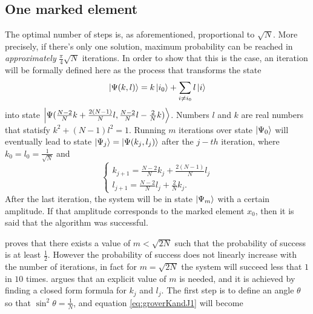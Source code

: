\documentclass[../../dissertation.tex]{subfiles}
\begin{document}
\subsection{One marked element}
The optimal number of steps is, as aforementioned, proportional to $\sqrt{N}$. More precisely, if there's only one solution, maximum probability can be reached in \textit{approximately} $\frac{\pi}{4}\sqrt{N}$ iterations. In order to show that this is the case, an iteration will be formally defined here as the process that transforms the state
\begin{equation}
	\ket{\Psi(k,l)} = k\ket{i_0} + \sum_{i\neq i_0}l\ket{i}
	\label{eq:groverQuantumRegister}
\end{equation}
into state $\ket{\Psi(\frac{N-2}{N}k + \frac{2(N-1)}{N}l, \frac{N-2}{N}l - \frac{2}{N}k)}$. Numbers $l$ and $k$ are real numbers that statisfy $k^2 + (N-1)l^2=1$. Running $m$ iterations over state $\ket{\Psi_0}$ will eventually lead to state $\ket{\Psi_j} = \ket{\Psi(k_j,l_j)}$ after the $j-th$ iteration, where $k_0 = l_0 = \frac{1}{\sqrt{N}}$ and
\begin{equation}
	\begin{cases}
		k_{j+1} = \frac{N-2}{N}k_j + \frac{2(N-1)}{N}l_j
		\\l_{j+1} = \frac{N-2}{N}l_j + \frac{2}{N}k_j.
	\end{cases}\label{eq:groverKandJ1}
\end{equation}
After the last iteration, the system will be in state $\ket{\Psi_m}$ with a certain amplitude. If that amplitude corresponds to the marked element $x_0$, then it is said that the algorithm was successful.\par
\cite{grover1996} proves that there exists a value of $m < \sqrt{2N}$ such that the probability of success is at least $\frac{1}{2}$. However the probability of success does not linearly increase with the number of iterations, in fact for $m=\sqrt{2N}$ the system will succeed less that $1$ in $10$ times. \cite{boyer1996} argues that an explicit value of $m$ is needed, and it is achieved by finding a closed form formula for $k_j$ and $l_j$. The first step is to define an angle $\theta$ so that $\sin^2\theta = \frac{1}{N}$, and equation \ref{eq:groverKandJ1} will become
\end{document}
